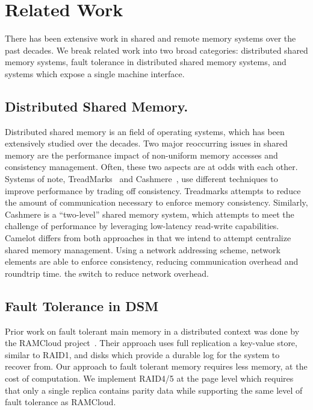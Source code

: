 \section{Related Work}
\label{sec:related}

There has been extensive work in shared and remote memory systems over the past
decades. We break related work into two broad categories: distributed shared
memory systems, fault tolerance in distributed shared memory systems, and
systems which expose a single machine interface.

\subsection{Distributed Shared Memory.} 
Distributed shared memory is an field of operating systems, which has been extensively
studied over the decades.
Two major reoccurring issues in shared memory are the performance impact of non-uniform memory 
accesses and consistency management. Often, these two aspects are at odds with each other.
Systems of note, TreadMarks~\cite{Keleher1994} and Cashmere~\cite{cashmere}, use different techniques 
to improve performance by trading off consistency. Treadmarks attempts to reduce
the amount of communication necessary to enforce memory consistency. Similarly, Cashmere is a 
``two-level'' shared memory system, which attempts to meet the challenge of performance by leveraging 
low-latency read-write capabilities. Camelot differs from both approaches in that we intend to attempt 
centralize shared memory management. Using a network addressing scheme, network elements are able to 
enforce consistency, reducing communication overhead and roundtrip time.   the switch to reduce 
network overhead.


\subsection{Fault Tolerance in DSM} Prior work on fault tolerant main memory in a
distributed context was done by the RAMCloud project~\cite{Ousterhout:2015:RSS:2818727.2806887}. 
Their approach uses full replication a key-value store, similar to RAID1, and
disks which provide a durable log for the system to recover from.  Our approach
to fault tolerant memory requires less memory, at the cost of computation. We
implement RAID4/5 at the page level which requires that only a single replica
contains parity data while supporting the same level of fault tolerance as
RAMCloud.


